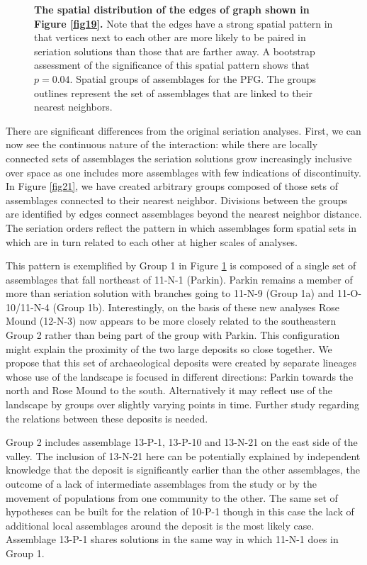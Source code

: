 \documentclass[10pt,letterpaper]{article}
\begin{document}
\begin{figure}[h]
\caption{{\bf The spatial distribution of the edges of graph shown in Figure \ref{fig19}.} Note that the edges have a strong spatial pattern in that vertices next to each other are more likely to be paired in seriation solutions than those that are farther away. A bootstrap assessment of the significance of this spatial pattern shows that $p=0.04$.  Spatial groups of assemblages for the PFG. The groups outlines represent the set of assemblages that are linked to their nearest neighbors.}
\label{fig20}
\end{figure}

There are significant differences from the original seriation analyses. First, we can now see the continuous nature of the interaction: while there are locally connected sets of assemblages the seriation solutions grow increasingly inclusive over space as one includes more assemblages with few indications of discontinuity. In Figure \ref{fig21}, we have created arbitrary groups composed of those sets of assemblages connected to their nearest neighbor. Divisions between the groups are identified by edges connect assemblages beyond the nearest neighbor distance. The seriation orders reflect the pattern in which assemblages form spatial sets in which are in turn related to each other at higher scales of analyses.

This pattern is exemplified by Group 1 in Figure \ref{fig20} is composed of a single set of assemblages that fall northeast of 11-N-1 (Parkin). Parkin remains a member of more than seriation solution with branches going to 11-N-9 (Group 1a) and 11-O-10/11-N-4 (Group 1b). Interestingly, on the basis of these new analyses Rose Mound (12-N-3) now appears to be more closely related to the southeastern Group 2 rather than being part of the group with Parkin. This configuration might explain the proximity of the two large deposits so close together. We propose that this set of archaeological deposits were created by separate lineages whose use of the landscape is focused in different directions: Parkin towards the north and Rose Mound to the south. Alternatively it may reflect use of the landscape by groups over slightly varying points in time. Further study regarding the relations between these deposits is needed.

Group 2 includes assemblage 13-P-1, 13-P-10 and 13-N-21 on the east side of the valley. The inclusion of 13-N-21 here can be potentially explained by independent knowledge that the deposit is significantly earlier than the other assemblages, the outcome of a lack of intermediate assemblages from the study or by the movement of populations from one community to the other. The same set of hypotheses can be built for the relation of 10-P-1 though in this case the lack of additional local assemblages around the deposit is the most likely case. Assemblage 13-P-1 shares solutions in the same way in which 11-N-1 does in Group 1. 
\end{document}
